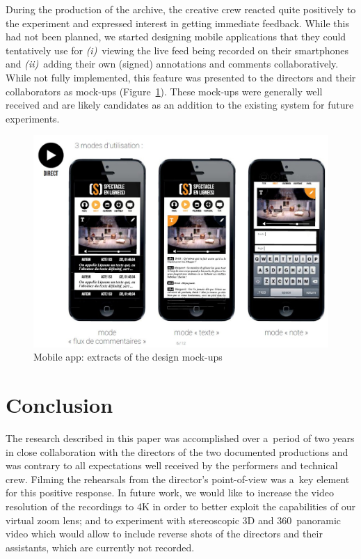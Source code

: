 \documentclass[conference]{IEEEtran}
\begin{document}
During the production of the archive, the creative crew reacted quite positively to the experiment and expressed  interest in getting immediate feedback. While this had not been planned, we started designing mobile applications that they could tentatively use for \emph{(i)}~viewing the live feed being recorded on their smartphones and \emph{(ii)}~adding their own (signed) annotations and comments collaboratively.  While not fully implemented, this feature was presented to the directors and their collaborators as mock-ups (Figure~\ref{fig:mobileapp}). These mock-ups were generally well received and are likely candidates  as an addition to the existing system for future experiments. 

\begin{figure}[htb!]
  \centering
  \includegraphics[width=\columnwidth]{mobileapp}
  \caption{Mobile app: extracts of the design mock-ups}
  \label{fig:mobileapp}
\end{figure}


 


\section{Conclusion}
\label{sec:conclusion}

The research described in this paper was accomplished over a~period of two years 
in close collaboration with the directors of the two documented productions and was 
contrary to all expectations well received by the performers and technical crew. Filming the rehearsals
from the director's point-of-view was a~key element for this positive response. In future work,
we would like to increase the video resolution of the recordings to 4K in order to better exploit
the capabilities of our virtual zoom lens; and to experiment with stereoscopic 3D and 360\degree~panoramic video
which would allow to include reverse shots of the directors and their assistants, which are currently not recorded.
\end{document}
